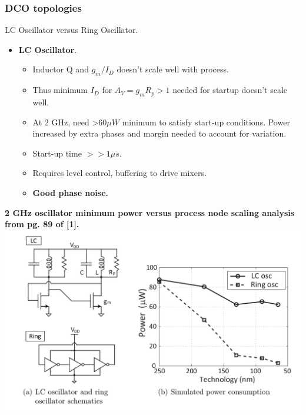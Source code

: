 \documentclass[t, screen, aspectratio=43]{beamer}
\begin{document}
\begin{frame}
	\frametitle{DCO topologies}
	\begin{block}{LC Oscillator versus Ring Oscillator.}
	\begin{minipage}{6cm}
		\vspace{1em}
		\begin{itemize}
			\scriptsize
			\item \textbf{LC Oscillator}.
			\begin{itemize}
				\scriptsize
				\item Inductor Q and $g_m/I_D$ doesn't scale well with process.
				\item Thus minimum $I_D$ for $A_V = g_mR_p > 1$ needed for startup doesn't scale well.
				\item At 2 GHz, need >$60 \mu W$ minimum to satisfy start-up conditions. Power increased by extra phases and margin needed to account for variation.
				\item Start-up time $>>1\mu s$.
				\item Requires level control, buffering to drive mixers.
				\item \textbf{Good phase noise.}
			\end{itemize}
		\end{itemize} 	
		\end{minipage}
		\begin{minipage}{5cm}
				\vspace{1em}
			\tiny
			\textbf{2 GHz oscillator minimum power versus process node scaling analysis from pg. 89 of  [1].}
			\center\includegraphics[width=1\textwidth, angle=0]{lc_vs_ro_power.png}
		\end{minipage}
	\end{block}
\end{frame}
\end{document}
